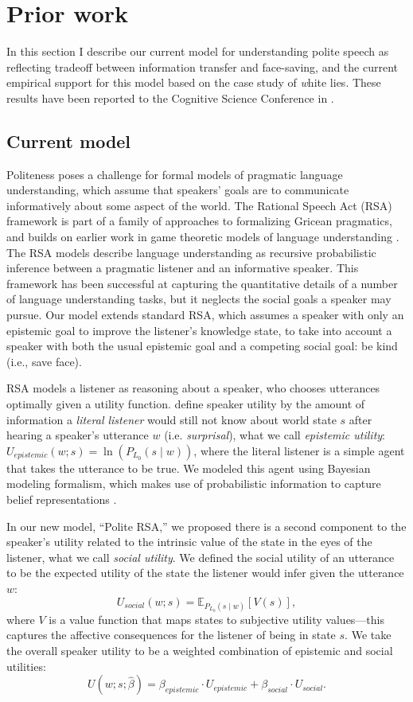 \section{Prior work}
In this section I describe our current model for understanding polite speech as reflecting tradeoff between information transfer and face-saving, and the current empirical support for this model based on the case study of {\emph white lies}. These results have been reported to the Cognitive Science Conference in \citet{yoon2016}. 

\subsection{Current model}

Politeness poses a challenge for formal models of pragmatic language understanding, which assume that speakers' goals are to communicate informatively about some aspect of the world. The Rational Speech Act (RSA) framework \citep{goodman2016} is part of a family of approaches to formalizing Gricean pragmatics, and builds on earlier work in game theoretic models of language understanding \citep{benz2006}. The RSA models describe language understanding as recursive probabilistic inference between a pragmatic listener and an informative speaker. This framework has been successful at capturing the quantitative details of a number of language understanding tasks, but it neglects the social goals a speaker may pursue. Our model extends standard RSA, which assumes a speaker with only an epistemic goal to improve the listener's knowledge state, to take into account a speaker with both the usual epistemic goal and a competing social goal: be kind (i.e., save face).

RSA models a listener as reasoning about a speaker, who chooses utterances optimally given a utility function. \citet{Goodman2013} define speaker utility by the amount of information a \emph{literal listener} would still not know about world state $s$ after hearing a speaker's utterance $w$ (i.e. \emph{surprisal}), what we call \emph{epistemic utility}:
$U_{epistemic}(w; s) = \ln(P_{L_0}(s \mid w)) $,
where the literal listener is a simple agent that takes the utterance to be true.
We modeled this agent using Bayesian modeling formalism, which makes use of probabilistic information to capture belief representations \citep{tenenbaum2011}.

In our new model, ``Polite RSA,'' we proposed there is a second component to the speaker's utility related to the intrinsic value of the state in the eyes of the listener, what we call \emph{social utility}.
We defined the social utility of an utterance to be the expected utility of the state the listener would infer given the utterance $w$:
$$
U_{social}(w; s) = \mathbb{E}_{P_{L_0}(s \mid w)}[V(s)],
$$
%
where $V$ is a value function that maps states to subjective utility values---this captures the affective consequences for the listener of being in state $s$.
%
We take the overall speaker utility to be a weighted combination of epistemic and social utilities:
$$
U(w;s;  \hat{\beta}) = \beta_{epistemic}\cdot U_{epistemic} + \beta_{social} \cdot U_{social}.
$$

